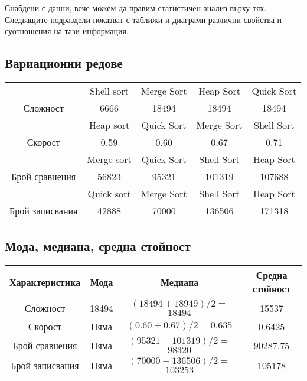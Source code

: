 \documentclass[12pt,a4paper]{article}
\begin{document}
Снабдени с данни, вече можем да правим статистичен анализ върху тях. Следващите подраздели показват с таближи и диаграми различни свойства и суотношения на тази информация.

\subsection{Вариационни редове}

\begin{center}
\begin{tabular}{|c|c c c c|}
	\hline
	 & Shell sort & Merge Sort & Heap Sort & Quick Sort \\[3pt]
	Сложност & 6666 & 18494 & 18494 & 18494 \\[3pt]
	\hline\hline
	 & Heap sort & Quick Sort & Merge Sort & Shell Sort \\[3pt]
	Скорост & 0.59 & 0.60 & 0.67 & 0.71 \\[3pt]
	\hline\hline
	 & Merge sort & Quick Sort & Shell Sort & Heap Sort \\[3pt]
	Брой сравнения & 56823 & 95321 & 101319 & 107688 \\[3pt]
	\hline\hline
	 & Quick sort & Merge Sort & Shell Sort & Heap Sort \\[3pt]
	Брой записвания & 42888 & 70000 & 136506 & 171318 \\[3pt]
	\hline
\end{tabular}
\end{center}

\subsection{Мода, медиана, средна стойност}

\begin{center}
\begin{tabular}{|c|c c c|}
	\hline
	Характеристика & Мода & Медиана  & Средна стойност\\[3pt]
	\hline\hline
	Сложност & 18494 & $(18494 + 18949)/2 = $\underline{$18494$} & 15537 \\[3pt]
	Скорост & Няма & $(0.60+0.67)/2 = $\underline{$0.635$} & 0.6425 \\[3pt]
	Брой сравнения & Няма & $(95321 + 101319)/2 = $\underline{$98320$} & 90287.75 \\[3pt]
	Брой записвания & Няма & $(70000 + 136506)/2 = $\underline{$103253$} & 105178 \\[3pt]
	\hline
\end{tabular}
\end{center}
\end{document}
